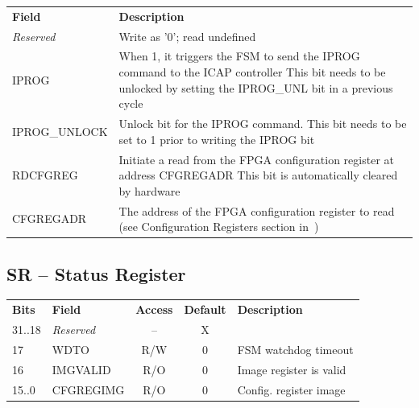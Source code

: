\documentclass[a4paper,11pt]{article}
\begin{document}
\begin{appendices}
\vspace*{11pt}

\noindent
{
  \begin{tabular}{l p{}}
  \textbf{Field}    & \textbf{Description} \\
  \textit{Reserved} & Write as '0'; read undefined \\
  IPROG    & When 1, it triggers the FSM to send the IPROG command to the ICAP controller \newline
             This bit needs to be unlocked by setting the IPROG\_UNL bit in a previous cycle \\
  IPROG\_UNLOCK & Unlock bit for the IPROG command. This bit needs to be set to 1 prior to writing
               the IPROG bit \\
  RDCFGREG & Initiate a read from the FPGA configuration register at address CFGREGADR \newline
             This bit is automatically cleared by hardware \\
  CFGREGADR & The address of the FPGA configuration register to read (see Configuration Registers
              section in~\cite{ug380})\\
  \end{tabular}
}

\subsection{SR -- Status Register}
\label{app:sr}

\begin{tabular}{l l c c l}
\textbf{Bits} & \textbf{Field}    & \textbf{Access} & \textbf{Default} & \textbf{Description} \\
31..18        & \textit{Reserved} & --              & X                & \\
17            & WDTO              & R/W             & 0                & FSM watchdog timeout \\
16            & IMGVALID          & R/O             & 0                & Image register is valid \\
15..0         & CFGREGIMG         & R/O             & 0                & Config. register image \\
\end{tabular}

\vspace*{11pt}

\noindent
{
  \begin{tabular}{l p{}}


\end{tabular}}
\end{appendices}
\end{document}
